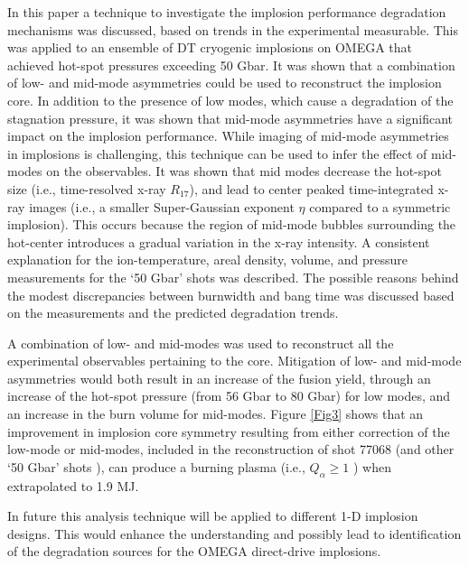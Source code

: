 \documentclass[aip,reprint]{revtex4-1}
\begin{document}
 In this paper a technique to investigate the implosion performance degradation mechanisms was discussed, based on trends in the experimental measurable. This was applied to an ensemble of DT cryogenic implosions on OMEGA that achieved hot-spot pressures exceeding 50 Gbar.\cite{Exp_Regan} It was shown that a combination of low- and mid-mode asymmetries could be used to reconstruct the implosion core.\cite{Exp_Bose} In addition to the presence of low modes, which cause a degradation of the stagnation pressure, it was shown that mid-mode asymmetries have a significant impact on the implosion performance. While imaging of mid-mode asymmetries in implosions is challenging, this technique can be used to infer the effect of mid-modes on the observables. It was shown that mid modes decrease the hot-spot size (i.e., time-resolved x-ray $R_{17}$), and lead to center peaked time-integrated x-ray images (i.e., a smaller Super-Gaussian exponent $\eta$ compared to a symmetric implosion). This occurs because the region of mid-mode bubbles surrounding the hot-center introduces a gradual variation in the x-ray intensity. A consistent explanation for the ion-temperature, areal density, volume, and pressure measurements for the `50 Gbar' shots was described. The possible reasons behind the modest discrepancies between burnwidth and bang time was discussed based on the measurements and the predicted degradation trends. 

 A combination of low- and mid-modes was used to reconstruct all the experimental observables pertaining to the core. Mitigation of low- and mid-mode asymmetries would both result in an increase of the fusion yield, through an increase of the hot-spot pressure (from 56 Gbar to 80 Gbar) for low modes, and an increase in the burn volume for mid-modes. Figure \ref{Fig3} shows that an improvement in implosion core symmetry resulting from either correction of the low-mode or mid-modes, included in the reconstruction of shot 77068 (and other `50 Gbar' shots \cite{Exp_Regan}), can produce a burning plasma (i.e., $Q_\alpha \geq 1 $  \cite{Betti-alphaheat}) when extrapolated to 1.9 MJ.\cite{Exp_Bose} 

 In future this analysis technique will be applied to different 1-D implosion designs. This would enhance the understanding and possibly lead to identification of the degradation sources for the OMEGA direct-drive implosions. 
%
%
%
\end{document}
